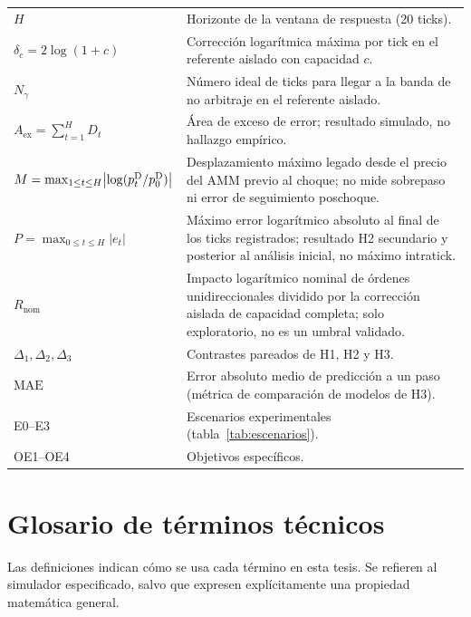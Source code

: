 \begin{center}
\begin{tabularx}{\textwidth}{@{}l X@{}}
$H$ & Horizonte de la ventana de respuesta (20 ticks). \\
$\delta_c=2\log(1+c)$ & Corrección logarítmica máxima por tick en el referente aislado con capacidad $c$. \\
$N_\gamma$ & Número ideal de ticks para llegar a la banda de no arbitraje en el referente aislado. \\
$A_{\mathrm{ex}} = \sum_{t=1}^{H} D_t$ & Área de exceso de error; resultado simulado, no hallazgo empírico. \\
$M = \max_{1\le t\le H}\bigl|\log(p^{\mathrm{D}}_t/p^{\mathrm{D}}_0)\bigr|$ & Desplazamiento máximo legado desde el precio del AMM previo al choque; no mide sobrepaso ni error de seguimiento poschoque. \\
$P = \max_{0\le t\le H}|e_t|$ & Máximo error logarítmico absoluto al final de los ticks registrados; resultado H2 secundario y posterior al análisis inicial, no máximo intratick. \\
$R_{\mathrm{nom}}$ & Impacto logarítmico nominal de órdenes unidireccionales dividido por la corrección aislada de capacidad completa; solo exploratorio, no es un umbral validado. \\
$\Delta_1,\Delta_2,\Delta_3$ & Contrastes pareados de H1, H2 y H3. \\
$\mathrm{MAE}$ & Error absoluto medio de predicción a un paso (métrica de comparación de modelos de H3). \\
E0--E3 & Escenarios experimentales (tabla~\ref{tab:escenarios}). \\
OE1--OE4 & Objetivos específicos. \\
\bottomrule
\end{tabularx}
\end{center}

\section*{Glosario de términos técnicos}
{}

\begingroup
\small
\setlength{\parskip}{0.15em}
Las definiciones indican cómo se usa cada término en esta tesis. Se refieren al
simulador especificado, salvo que expresen explícitamente una propiedad matemática general.

